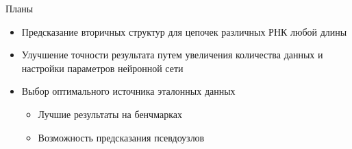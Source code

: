 \documentclass{beamer}
\begin{document}
\begin{frame}{Планы}
\begin{itemize}
    \item Предсказание вторичных структур для цепочек различных РНК любой длины
    \item Улучшение точности результата путем увеличения количества данных и настройки параметров нейронной сети 
    \item Выбор оптимального источника эталонных данных
    \begin{itemize}
        \item Лучшие результаты на бенчмарках
        \item Возможность предсказания псевдоузлов
    \end{itemize}
\end{itemize}

\end{frame}
\end{document}
